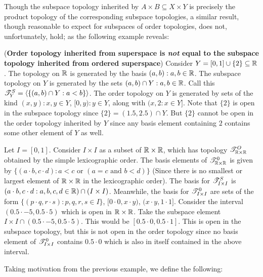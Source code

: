 \documentclass[main.tex]{subfiles}
\begin{document}
Though the subspace topology inherited by $A \times B \subseteq X \times Y$ is precisely the product topology of the corresponding subspace topologies, a similar result, though reasonable to expect for subspaces of order topologies, does not, unfortunately, hold; as the following example reveals:
\begin{example} (\textbf{Order topology inherited from superspace is \emph{not} equal to the subspace topology inherited from ordered superspace})
    Consider $Y=[0,1] \cup \{2\} \subseteq \mathbb R$. The topology on $\mathbb R$ is generated by the basis $(a,b):a,b \in \mathbb R$. The subspace topology on $Y$ is generated by the sets $(a,b) \cap Y: a,b \in \mathbb R$. Call this $\mathscr T^S_Y=\langle \{(a,b)\cap Y: a<b\}\rangle$.  The order topology on $Y$ is generated by sets of the kind $(x,y): x,y \in Y$, $[0,y): y \in Y$, along with $(x,2: x \in Y]$. Note that $\{2\}$ is open in the subspace topology since $\{2\}=(1.5,2.5) \cap Y$. But $\{2\}$ cannot be open in the order topology inherited by $Y$ since any basis element containing $2$ contains some other element of $Y$ as well. \end{example}

    \begin{example}
        Let $I=[0,1]$. Consider $I \times I$ as a subset of $\mathbb R\times \mathbb R$, which has topology $\mathscr T^O_{\mathbb R \times \mathbb R}$ obtained by the simple lexicographic order. The basis elements of $\mathscr T^0_{\mathbb R \times \mathbb R}$ is given by $\{(a\cdot b, c \cdot d): a<c \text{ or } (a=c \text{ and }b<d )\}$ (Since there is no smallest or largest element of $\mathbb R \times \mathbb R$ in the lexicographic order). The basis for $\mathscr T^S_{I \times I}$ is $(a\cdot b, c\cdot d: a,b,c,d \in \mathbb R ) \cap (I \times I)$. Meanwhile, the basis for $\mathscr T^0_{I \times I}$ are sets of the form $\{(p\cdot q, r\cdot s):p,q,r,s \in I\}$, $[0\cdot 0, x \cdot y)$, $(x\cdot y, 1\cdot 1]$. Consider the interval $(0.5\cdot-5,0.5\cdot5)$ which is open in $\mathbb R \times \mathbb R$. Take the subspace element $I \times I \cap (0.5 \cdot -5, 0.5\cdot 5)$. This would be $[0.5 \cdot 0, 0.5 \cdot 1]$. This is open in the subspace topology, but this is not open in the order topology since no basis element of $\mathscr T^0_{I \times I}$ contains $0.5 \cdot 0$ which is also in itself contained in the above interval.
\end{example}
Taking motivation from the previous example, we define the following:
\end{document}
